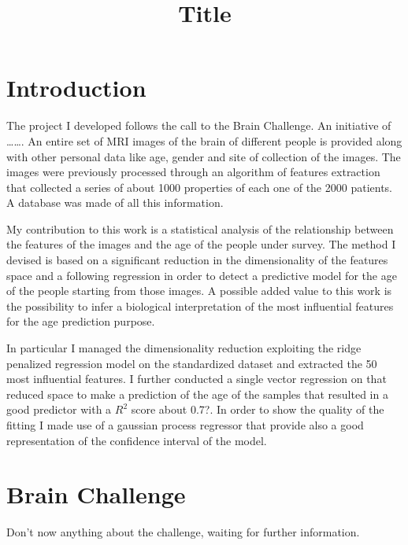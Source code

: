 \documentclass[11pt,a4paper]{report}
\begin{document}
\title{Title}

\section*{Introduction}
The project I developed follows the call to the Brain Challenge. An initiative of \dots \dots.
An entire set of MRI images of the brain of different people is provided along with other personal data like age, gender and site of collection of the images. The images were previously processed through an algorithm of features extraction that collected a series of about 1000 properties of each one of the 2000 patients. A database was made of all this information.

My contribution to this work is a statistical analysis of the relationship between the features of the images and the age of the people under survey. The method I devised is based on a significant reduction in the dimensionality of the features space and a following regression in order to detect a predictive model for the age of the people starting from those images. A possible added value to this work is the possibility to infer a biological interpretation of the most influential features for the age prediction purpose.

In particular I managed the dimensionality reduction exploiting the ridge penalized regression model on the standardized dataset and extracted the 50 most influential features. I further conducted a single vector regression on that reduced space to make a prediction of the age of the samples that resulted in a good predictor with a $R^{2}$ score about 0.7?. In order to show the quality of the fitting I made use of a gaussian process regressor that provide also a good representation of the confidence interval of the model.


\section*{Brain Challenge}
Don't now anything about the challenge, waiting for further information. 

\end{document}
